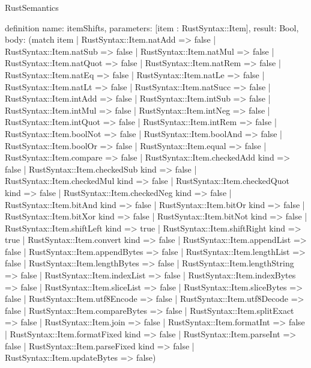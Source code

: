 \begin{lexlean}{RustSemantics}
\begin{semanticmodule}
definition{
  name: itemShifts,
  parameters: [item : RustSyntax::Item],
  result: Bool,
  body: (match item
    | RustSyntax::Item.natAdd => false
    | RustSyntax::Item.natSub => false
    | RustSyntax::Item.natMul => false
    | RustSyntax::Item.natQuot => false
    | RustSyntax::Item.natRem => false
    | RustSyntax::Item.natEq => false
    | RustSyntax::Item.natLe => false
    | RustSyntax::Item.natLt => false
    | RustSyntax::Item.natSucc => false
    | RustSyntax::Item.intAdd => false
    | RustSyntax::Item.intSub => false
    | RustSyntax::Item.intMul => false
    | RustSyntax::Item.intNeg => false
    | RustSyntax::Item.intQuot => false
    | RustSyntax::Item.intRem => false
    | RustSyntax::Item.boolNot => false
    | RustSyntax::Item.boolAnd => false
    | RustSyntax::Item.boolOr => false
    | RustSyntax::Item.equal => false
    | RustSyntax::Item.compare => false
    | RustSyntax::Item.checkedAdd kind => false
    | RustSyntax::Item.checkedSub kind => false
    | RustSyntax::Item.checkedMul kind => false
    | RustSyntax::Item.checkedQuot kind => false
    | RustSyntax::Item.checkedNeg kind => false
    | RustSyntax::Item.bitAnd kind => false
    | RustSyntax::Item.bitOr kind => false
    | RustSyntax::Item.bitXor kind => false
    | RustSyntax::Item.bitNot kind => false
    | RustSyntax::Item.shiftLeft kind => true
    | RustSyntax::Item.shiftRight kind => true
    | RustSyntax::Item.convert kind => false
    | RustSyntax::Item.appendList => false
    | RustSyntax::Item.appendBytes => false
    | RustSyntax::Item.lengthList => false
    | RustSyntax::Item.lengthBytes => false
    | RustSyntax::Item.lengthString => false
    | RustSyntax::Item.indexList => false
    | RustSyntax::Item.indexBytes => false
    | RustSyntax::Item.sliceList => false
    | RustSyntax::Item.sliceBytes => false
    | RustSyntax::Item.utf8Encode => false
    | RustSyntax::Item.utf8Decode => false
    | RustSyntax::Item.compareBytes => false
    | RustSyntax::Item.splitExact => false
    | RustSyntax::Item.join => false
    | RustSyntax::Item.formatInt => false
    | RustSyntax::Item.formatFixed kind => false
    | RustSyntax::Item.parseInt => false
    | RustSyntax::Item.parseFixed kind => false
    | RustSyntax::Item.updateBytes => false)
}


\end{semanticmodule}
\end{lexlean}
